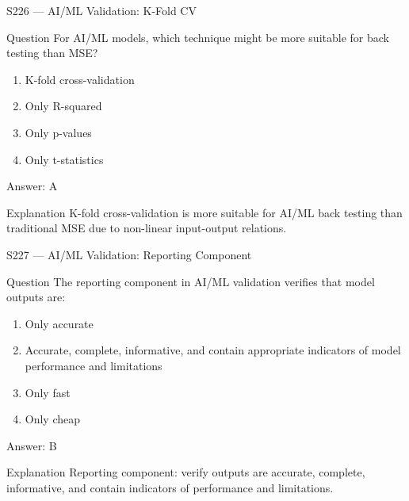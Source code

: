 \documentclass[aspectratio=169,8pt]{beamer}
\begin{document}
	\begin{frame}{S226 --- AI/ML Validation: K-Fold CV}
		\begin{block}{Question}
			For AI/ML models, which technique might be more suitable for back testing than MSE?
			\begin{enumerate}
				\item K-fold cross-validation
				\item Only R-squared
				\item Only p-values
				\item Only t-statistics
			\end{enumerate}
		\end{block}
		\begin{exampleblock}{Answer: A}\end{exampleblock}
		\begin{block}{Explanation}
			K-fold cross-validation is more suitable for AI/ML back testing than traditional MSE due to non-linear input-output relations.
		\end{block}
	\end{frame}
	
	\begin{frame}{S227 --- AI/ML Validation: Reporting Component}
		\begin{block}{Question}
			The reporting component in AI/ML validation verifies that model outputs are:
			\begin{enumerate}
				\item Only accurate
				\item Accurate, complete, informative, and contain appropriate indicators of model performance and limitations
				\item Only fast
				\item Only cheap
			\end{enumerate}
		\end{block}
		\begin{exampleblock}{Answer: B}\end{exampleblock}
		\begin{block}{Explanation}
			Reporting component: verify outputs are accurate, complete, informative, and contain indicators of performance and limitations.
		\end{block}
	\end{frame}
	
\end{document}
